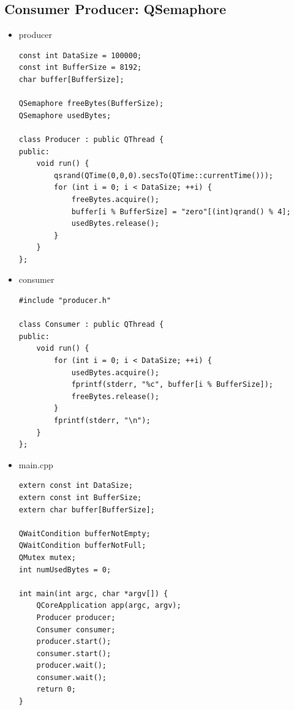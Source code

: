 \documentclass[9pt,b5paper]{article}
\begin{document}
\subsection{Consumer Producer: QSemaphore}
\label{sec-6-4}
\begin{itemize}
\item producer
\lstset{language=java,label= ,caption= ,numbers=none}
\begin{lstlisting}
const int DataSize = 100000;
const int BufferSize = 8192;
char buffer[BufferSize];

QSemaphore freeBytes(BufferSize);
QSemaphore usedBytes;

class Producer : public QThread {
public:
    void run() {
        qsrand(QTime(0,0,0).secsTo(QTime::currentTime()));
        for (int i = 0; i < DataSize; ++i) {
            freeBytes.acquire();
            buffer[i % BufferSize] = "zero"[(int)qrand() % 4];
            usedBytes.release();
        }
    }
};
\end{lstlisting}
\item consumer
\lstset{language=java,label= ,caption= ,numbers=none}
\begin{lstlisting}
#include "producer.h"

class Consumer : public QThread {
public:
    void run() {
        for (int i = 0; i < DataSize; ++i) {
            usedBytes.acquire();
            fprintf(stderr, "%c", buffer[i % BufferSize]);
            freeBytes.release();
        }
        fprintf(stderr, "\n");
    }
};
\end{lstlisting}
\item main.cpp
\lstset{language=java,label= ,caption= ,numbers=none}
\begin{lstlisting}
extern const int DataSize;
extern const int BufferSize;
extern char buffer[BufferSize];

QWaitCondition bufferNotEmpty;
QWaitCondition bufferNotFull;
QMutex mutex;
int numUsedBytes = 0;

int main(int argc, char *argv[]) {
    QCoreApplication app(argc, argv);
    Producer producer;
    Consumer consumer;
    producer.start();
    consumer.start();
    producer.wait();
    consumer.wait();
    return 0;
}
\end{lstlisting}
\end{itemize}
\end{document}
